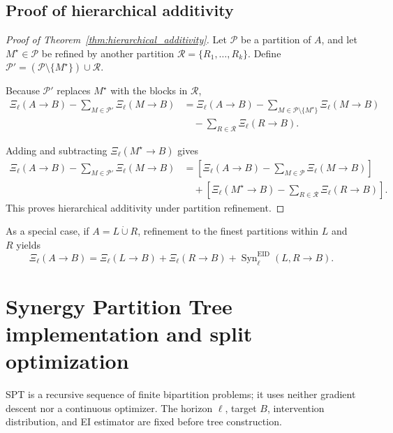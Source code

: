 \documentclass[fleqn,10pt]{wlscirep}
\begin{document}
\subsection{Proof of hierarchical additivity}
\label{app:proof_hierarchical_additivity}
\begin{proof}[Proof of Theorem~\ref{thm:hierarchical_additivity}]
Let \(\mathcal{P}\) be a partition of \(A\), and let
\(M^{\star}\in\mathcal{P}\) be refined by another partition
\(\mathcal{R}=\{R_1,\ldots,R_k\}\). Define
\(\mathcal{P}'
=(\mathcal{P}\setminus\{M^{\star}\})\cup\mathcal{R}\).

\par Because \(\mathcal{P}'\) replaces \(M^{\star}\) with the blocks in \(\mathcal{R}\),
\begin{align}
    \Xi_{\ell}(A\rightarrow B)-\sum_{M\in\mathcal{P}'}\Xi_{\ell}(M\rightarrow B)
    &=\Xi_{\ell}(A\rightarrow B)-\sum_{M\in\mathcal{P}\setminus\{M^{\star}\}}\Xi_{\ell}(M\rightarrow B)
    \nonumber\\
    &\quad-\sum_{R\in\mathcal{R}}\Xi_{\ell}(R\rightarrow B).
    \label{eq:supp_refined_synergy}\end{align}

Adding and subtracting \(\Xi_{\ell}(M^{\star}\rightarrow B)\) gives
\begin{align}
    \Xi_{\ell}(A\rightarrow B)-\sum_{M\in\mathcal{P}'}\Xi_{\ell}(M\rightarrow B)
    &=\left[\Xi_{\ell}(A\rightarrow B)-\sum_{M\in\mathcal{P}}\Xi_{\ell}(M\rightarrow B)\right]
    \nonumber\\
    &\quad+\left[\Xi_{\ell}(M^{\star}\rightarrow B)-\sum_{R\in\mathcal{R}}\Xi_{\ell}(R\rightarrow B)\right].
    \label{eq:supp_hierarchical_additivity}
\end{align}This proves hierarchical additivity under partition refinement.
\end{proof}

As a special case, if \(A=L\mathbin{\dot{\cup}}R\), refinement to the finest
partitions within \(L\) and \(R\) yields
\begin{equation}
    \Xi_{\ell}(A\rightarrow B)
    =
    \Xi_{\ell}(L\rightarrow B)
    +
    \Xi_{\ell}(R\rightarrow B)
    +
    \operatorname{Syn}^{\mathrm{EID}}_{\ell}
    (L,R\rightarrow B).
    \label{eq:supp_binary_hierarchy}
\end{equation}

\section{Synergy Partition Tree implementation and split optimization} 
\label{app:spt_implementation}
SPT is a recursive sequence of finite bipartition problems; it uses neither gradient descent nor a continuous optimizer. The horizon \(\ell\), target \(B\), intervention distribution, and EI estimator are fixed before tree construction. 
\end{document}
